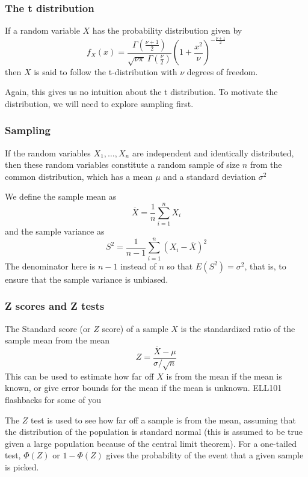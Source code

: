 \documentclass[10pt, aspectratio=169]{beamer}
\theoremstyle{definition}
\begin{document}
\begin{frame}
\frametitle{The t distribution}
\begin{definition}
	If a random variable $X$ has the probability distribution given by $$f_X(x) = \frac{\Gamma\left(\frac{\nu+1}{2}\right)}{\sqrt{\nu \pi}\ \Gamma\left(\frac{\nu}{2}\right)}\left(1+\frac{x^{2}}{\nu}\right)^{-\frac{\nu+1}{2}}$$ then $X$ is said to follow the t-distribution with $\nu$ degrees of freedom.
\end{definition}
\pause

Again, this gives us no intuition about the t distribution. To motivate the distribution, we will need to explore sampling first.
\end{frame}

\begin{frame}
\frametitle{Sampling}
\begin{definition}
	If the random variables $X_1,\ldots,X_n$ are independent and identically distributed, then these random variables constitute a random sample of size $n$ from the common distribution, which has a mean $\mu$ and a standard deviation $\sigma^2$

	We define the sample mean as $$\overline{X} = \frac{1}{n}\sum_{i=1}^n X_i$$ and the sample variance as $$S^2 = \frac{1}{n-1}\sum_{i=1}^n (X_i - \overline{X})^2$$ The denominator here is $n-1$ instead of $n$ so that $E(S^2) = \sigma^2$, that is, to ensure that the sample variance is unbiased.
\end{definition}
\end{frame}

\begin{frame}
\frametitle{Z scores and Z tests}
\begin{definition}
	The Standard score (or $Z$ score) of a sample $X$ is the standardized ratio of the sample mean from the mean
	$$Z = \frac{\overline{X}-\mu}{\sigma/\sqrt{n}}$$
	This can be used to estimate how far off $X$ is from the mean if the mean is known, or give error bounds for the mean if the mean is unknown. {\tiny ELL101 flashbacks for some of you}
\end{definition}
\pause
\begin{definition}
	The $Z$ test is used to see how far off a sample is from the mean, assuming that the distribution of the population is standard normal (this is assumed to be true given a large population because of the central limit theorem). For a one-tailed test, $\Phi(Z)$ or $1-\Phi(Z)$ gives the probability of the event that a given sample is picked.
\end{definition}
\end{frame}
\end{document}

